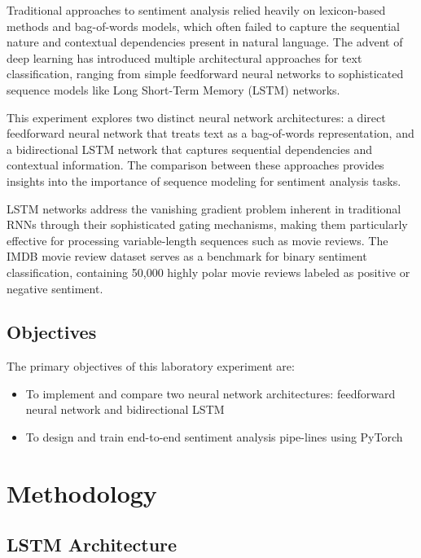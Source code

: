 \documentclass[a4paper, journal]{IEEEtran}
\begin{document}
Traditional approaches to sentiment analysis relied heavily on lexicon-based methods and bag-of-words models, which often failed to capture the sequential nature and contextual dependencies present in natural language. The advent of deep learning has introduced multiple architectural approaches for text classification, ranging from simple feedforward neural networks to sophisticated sequence models like Long Short-Term Memory (LSTM) networks.

This experiment explores two distinct neural network architectures: a direct feedforward neural network that treats text as a bag-of-words representation, and a bidirectional LSTM network that captures sequential dependencies and contextual information. The comparison between these approaches provides insights into the importance of sequence modeling for sentiment analysis tasks.

LSTM networks address the vanishing gradient problem inherent in traditional RNNs through their sophisticated gating mechanisms, making them particularly effective for processing variable-length sequences such as movie reviews. The IMDB movie review dataset serves as a benchmark for binary sentiment classification, containing 50,000 highly polar movie reviews labeled as positive or negative sentiment.

\subsection{Objectives}

The primary objectives of this laboratory experiment are:
\begin{itemize}
    \item To implement and compare two neural network architectures: feedforward neural network and bidirectional LSTM
    
    \item To design and train end-to-end sentiment analysis pipe-lines using PyTorch

\end{itemize}

\section{Methodology}

\subsection{LSTM Architecture}
\end{document}
